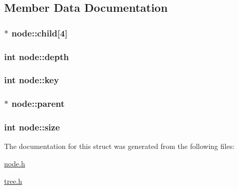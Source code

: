\subsection{\-Member \-Data \-Documentation}
\hypertarget{structnode_aef19e5e5e309dbf0b83cc80450ac5b50}{
\subsubsection[{child}]{$\ast$ {\bf node\-::child}\mbox{[}4\mbox{]}}}\label{structnode_aef19e5e5e309dbf0b83cc80450ac5b50}
\hypertarget{structnode_a24b9265ea66a07c6ff1bcc021f400082}{
\subsubsection[{depth}]{\setlength{\rightskip}{0pt plus 5cm}int {\bf node\-::depth}}}\label{structnode_a24b9265ea66a07c6ff1bcc021f400082}
\hypertarget{structnode_aa1417e7fad3ebcf42dc0ec8b711f273d}{
\subsubsection[{key}]{\setlength{\rightskip}{0pt plus 5cm}int {\bf node\-::key}}}\label{structnode_aa1417e7fad3ebcf42dc0ec8b711f273d}
\hypertarget{structnode_a5e88137f1d0e2f7a940bccf4c3d3a4d3}{
\subsubsection[{parent}]{$\ast$ {\bf node\-::parent}}}\label{structnode_a5e88137f1d0e2f7a940bccf4c3d3a4d3}
\hypertarget{structnode_ad2ae38303b19ab4f3e1b16b105a78b60}{
\subsubsection[{size}]{\setlength{\rightskip}{0pt plus 5cm}int {\bf node\-::size}}}\label{structnode_ad2ae38303b19ab4f3e1b16b105a78b60}


\-The documentation for this struct was generated from the following files\-:\begin{DoxyCompactItemize}
\item 
\hyperlink{node_8h}{node.\-h}\item 
\hyperlink{tree_8h}{tree.\-h}\end{DoxyCompactItemize}
